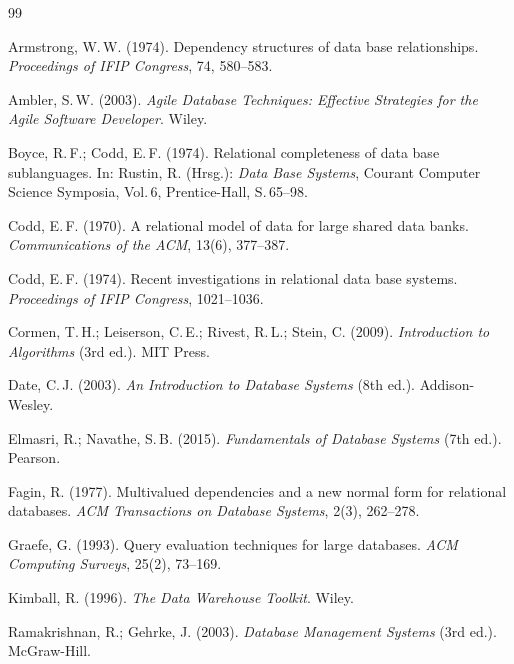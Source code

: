 ﻿\documentclass[12pt,a4paper]{article}
\theoremstyle{definition}
\theoremstyle{remark}
\begin{document}
\newpage

\begin{thebibliography}{99}

Armstrong, W.\,W. (1974).
\newblock Dependency structures of data base relationships.
\newblock \emph{Proceedings of IFIP Congress}, 74, 580--583.

Ambler, S.\,W. (2003).
\newblock \emph{Agile Database Techniques: Effective Strategies for the Agile
Software Developer}.
\newblock Wiley.

Boyce, R.\,F.; Codd, E.\,F. (1974).
\newblock Relational completeness of data base sublanguages.
\newblock In: Rustin, R. (Hrsg.): \emph{Data Base Systems}, Courant Computer
Science Symposia, Vol.\,6, Prentice-Hall, S.\,65--98.

Codd, E.\,F. (1970).
\newblock A relational model of data for large shared data banks.
\newblock \emph{Communications of the ACM}, 13(6), 377--387.

Codd, E.\,F. (1974).
\newblock Recent investigations in relational data base systems.
\newblock \emph{Proceedings of IFIP Congress}, 1021--1036.

Cormen, T.\,H.; Leiserson, C.\,E.; Rivest, R.\,L.; Stein, C. (2009).
\newblock \emph{Introduction to Algorithms} (3rd ed.).
\newblock MIT Press.

Date, C.\,J. (2003).
\newblock \emph{An Introduction to Database Systems} (8th ed.).
\newblock Addison-Wesley.

Elmasri, R.; Navathe, S.\,B. (2015).
\newblock \emph{Fundamentals of Database Systems} (7th ed.).
\newblock Pearson.

Fagin, R. (1977).
\newblock Multivalued dependencies and a new normal form for relational
databases.
\newblock \emph{ACM Transactions on Database Systems}, 2(3), 262--278.

Graefe, G. (1993).
\newblock Query evaluation techniques for large databases.
\newblock \emph{ACM Computing Surveys}, 25(2), 73--169.

Kimball, R. (1996).
\newblock \emph{The Data Warehouse Toolkit}.
\newblock Wiley.

Ramakrishnan, R.; Gehrke, J. (2003).
\newblock \emph{Database Management Systems} (3rd ed.).
\newblock McGraw-Hill.


\end{thebibliography}
\end{document}
